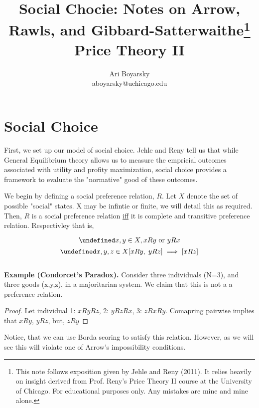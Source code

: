\documentclass[dvips,11pt]{article}
\let\oldforall\forall
\let\forall\undefined
\DeclareMathOperator{\forall}{\,\oldforall\,}
\DeclareMathOperator{\?}{\,?\,}
\begin{document}

\title{\vspace{-100pt}Social Chocie: Notes on Arrow, Rawls, and Gibbard-Satterwaithe\footnote{This note follows exposition given by Jehle and Reny (2011). It relies heavily on insight derived from Prof. Reny's Price Theory II course at the University of Chicago. For educational purposes only. Any mistakes are mine and mine alone.} \\ Price Theory II}
\author{Ari Boyarsky \\ aboyarsky@uchicago.edu}

\maketitle

\section{Social Choice}
First, we set up our model of social choice. Jehle and Reny tell us that while General Equilibrium theory allows us to measure the empricial outcomes associated with utility and profity maximization, social choice provides a framework to evaluate the "normative" good of these outcomes. 

We begin by defining a social preference relation, $R$. Let $X$ denote the set of possible "social" states. X may be infintie or finite, we will detail this as required. Then, $R$ is a social preference relation \underline{iff} it is complete and transitive preference relation. Respectivley that is,

$$\forall x,y \in X, xRy \text{ or } yRx$$
$$\forall x,y,z \in X [xRy, \; yRz] \implies [xRz]$$
\\\textbf{Example (Condorcet's Paradox).} Consider three individuals (N=3), and three goods (x,y,z), in a majoritarian system. We claim that this is not a a preference relation.
\begin{proof}
Let individual 1: $xRyRz$, 2: $yRzRx$, 3: $zRxRy$. Comapring pairwise implies that $xRy$, $yRz$, but, $zRy$
\end{proof}
Notice, that we can use Borda scoring to satisfy this relation. However, as we will see this will violate one of Arrow's impossibility conditions.
\end{document}
